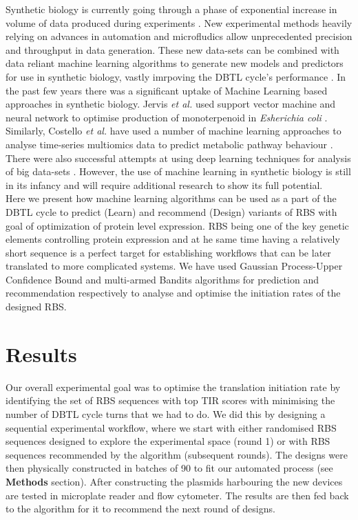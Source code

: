 \documentclass{article}
\begin{document}
Synthetic biology is currently going through a phase of exponential increase in volume of data produced during experiments \cite{Freemont2019}. New experimental methods heavily relying on advances in automation and microfludics allow unprecedented precision and throughput in data generation. These new data-sets can be combined with data reliant machine learning algorithms to generate new models and predictors for use in synthetic biology, vastly imrpoving the DBTL cycle's performance \cite{Camacho2018}. In the past few years there was a significant uptake of Machine Learning based approaches in synthetic biology. Jervis \emph{et al.} used support vector machine and neural network to optimise production of monoterpenoid in \emph{Esherichia coli} \cite{Jervis2019}. Similarly, Costello \emph{et al.} have used a number of machine learning approaches to analyse time-series multiomics data to predict metabolic pathway behaviour \cite{Costello2018}. There were also successful attempts at using deep learning techniques for analysis of big data-sets \cite{Alipanahi2015,Angermueller2016}. However, the use of machine learning in synthetic biology is still in its infancy and will require additional research to show its full potential. \\
Here we present how machine learning algorithms can be used as a part of the DBTL cycle to predict (Learn) and recommend (Design) variants of RBS with goal of optimization of protein level expression. RBS being one of the key genetic elements controlling protein expression and at he same time having a relatively short sequence is a perfect target for establishing workflows that can be later translated to more complicated systems. We have used Gaussian Process-Upper Confidence Bound and multi-armed Bandits algorithms for prediction and recommendation respectively to analyse and optimise the initiation rates of the designed RBS.



\section{Results}

Our overall experimental goal was to optimise the translation initiation rate by identifying the set of RBS sequences with top TIR scores with minimising the number of DBTL cycle turns that we had to do. We did this by designing a sequential experimental workflow, where we start with either randomised RBS sequences designed to explore the experimental space (round 1) or with RBS sequences recommended by the algorithm (subsequent rounds). The designs were then physically constructed in batches of 90 to fit our automated process (see \textbf{Methods} section). After constructing the plasmids harbouring the new devices are tested in microplate reader and flow cytometer. The results are then fed back to the algorithm for it to recommend the next round of designs.\\
\end{document}
